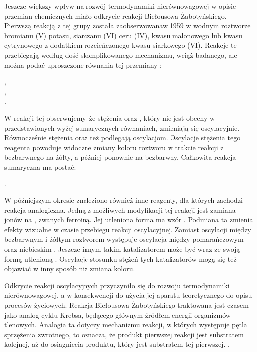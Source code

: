 \documentclass[10pt, a4paper, twoside, onecolumn]{article}
\numberwithin{equation}{section}
\begin{document}
	Jeszcze większy wpływ na rozwój termodynamiki nierównowagowej w opisie przemian chemicznych miało odkrycie reakcji Biełousowa-Żabotyńskiego. Pierwszą reakcją z tej grupy została zaobserwowanaw 1959 w wodnym roztworze bromianu (V) potasu, siarczanu (VI) ceru (IV), kwasu malonowego lub kwasu cytrynowego z dodatkiem rozcieńczonego kwasu siarkowego (VI). Reakcje te przebiegają według dość skomplikowanego mechanizmu, wciąż badanego, ale można podać uproszczone równania tej przemiany \cite{orlik}: %
	\begin{center}
		, \\
		, \\
		.
	\end{center}
	W reakcji tej obserwujemy, że stężenia  oraz , który nie jest obecny w przedstawionych wyżej sumarycznych równaniach, zmieniają się oscylacyjnie. Równocześnie stężenia  oraz  też podlegają oscylacjom. Oscylacje stężenia tego reagenta powoduje widoczne zmiany koloru roztworu w trakcie reakcji z bezbarwnego na żółty, a później ponownie na bezbarwny. Całkowita reakcja sumaryczna ma postać: 
	\begin{center}
		.
	\end{center}
	W późniejszym okresie znaleziono również inne reagenty, dla których zachodzi reakcja analogiczna. Jedną z możliwych modyfikacji tej reakcji jest zamiana jonów  na , zwanych ferroiną. Jej utleniona forma ma wzór . Podmiana ta zmienia efekty wizualne w czasie przebiegu reakcji oscylacyjnej. Zamiast oscylacji między bezbarwnym i żółtym roztworem występuje oscylacja między pomarańczowym oraz niebieskim \cite{orlik}. Jeszcze innym takim katalizatorem może być  wraz ze swoją formą utlenioną . Oscylacje stosunku stężeń tych katalizatorów mogą się też objawiać w inny sposób niż zmiana koloru. \cite{osypova}\par
	Odkrycie reakcji oscylacyjnych przyczyniło się do rozwoju termodynamiki nierównowagowej, a w konsekwencji do użycia jej aparatu teoretycznego do opisu procesów życiowych. 
	Reakcja Biełousowa-Żabotyńskiego traktowana jest czasem jako analog cyklu Krebsa, będącego głównym źródłem energii organizmów tlenowych. Analogia ta dotyczy mechanizmu reakcji, w których występuje pętla sprzężenia zwrotnego, to oznacza, że produkt pierwszej reakcji jest substratem kolejnej, aż do osiagniecia produktu, który jest substratem tej pierwszej. \cite{belousov_hist, stryer}. \par
\end{document}

